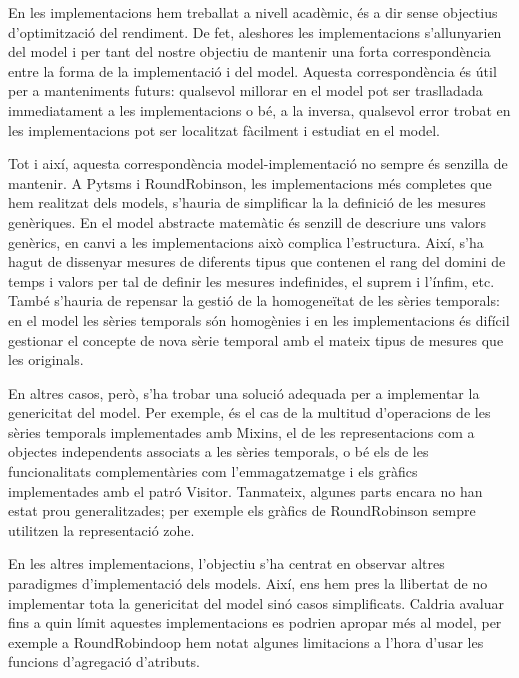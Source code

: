 En les implementacions hem treballat a nivell acadèmic, és a dir sense
objectius d'optimització del rendiment. De fet, aleshores les
implementacions s'allunyarien del model i per tant del nostre objectiu
de mantenir una forta correspondència entre la forma de la
implementació i del model. Aquesta correspondència és útil per a
manteniments futurs: qualsevol millorar en el model pot ser
traslladada immediatament a les implementacions o bé, a la inversa,
qualsevol error trobat en les implementacions pot ser localitzat
fàcilment i estudiat en el model.





Tot i així, aquesta correspondència model-implementació no sempre és
senzilla de mantenir. A Pytsms i RoundRobinson, les implementacions
més completes que hem realitzat dels models, s'hauria de simplificar
la la definició de les mesures genèriques.  En el model abstracte
matemàtic és senzill de descriure uns valors genèrics, en canvi a les
implementacions això complica l'estructura. Així, s'ha hagut de
dissenyar mesures de diferents tipus que contenen el rang del domini
de temps i valors per tal de definir les mesures indefinides, el
suprem i l'ínfim, etc.  També s'hauria de repensar la gestió de la
homogeneïtat de les sèries temporals: en el model les sèries temporals
són homogènies i en les implementacions és difícil gestionar el
concepte de nova sèrie temporal amb el mateix tipus de mesures que les
originals.

En altres casos, però, s'ha trobar una solució adequada per a
implementar la genericitat del model.  Per exemple, és el cas de la
multitud d'operacions de les sèries temporals implementades amb
Mixins, el de les representacions com a objectes independents
associats a les sèries temporals, o bé els de les funcionalitats
complementàries com l'emmagatzematge i els gràfics implementades amb
el patró Visitor. Tanmateix, algunes parts encara no han estat prou
generalitzades; per exemple els gràfics de RoundRobinson sempre
utilitzen la representació \gls{zohe}.





En les altres implementacions, l'objectiu s'ha centrat en observar
altres paradigmes d'implementació dels models. Així, ens hem pres la
llibertat de no implementar tota la genericitat del model sinó casos
simplificats. Caldria avaluar fins a quin límit aquestes
implementacions es podrien apropar més al model, per exemple a
RoundRobindoop hem notat algunes limitacions a l'hora d'usar les
funcions d'agregació d'atributs.


